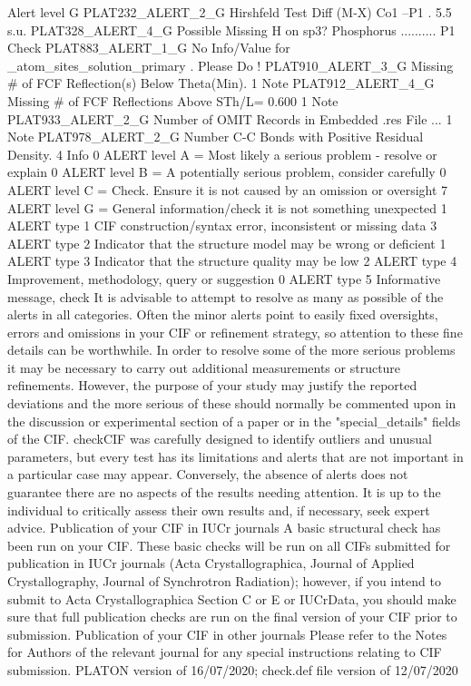  Alert level G
PLAT232_ALERT_2_G Hirshfeld Test Diff (M-X)  Co1      --P1       .        5.5 s.u.  
PLAT328_ALERT_4_G Possible Missing H on sp3? Phosphorus ..........         P1 Check 
PLAT883_ALERT_1_G No Info/Value for _atom_sites_solution_primary .     Please Do !  
PLAT910_ALERT_3_G Missing # of FCF Reflection(s) Below Theta(Min).          1 Note  
PLAT912_ALERT_4_G Missing # of FCF Reflections Above STh/L=  0.600          1 Note  
PLAT933_ALERT_2_G Number of OMIT Records in Embedded .res File ...          1 Note  
PLAT978_ALERT_2_G Number C-C Bonds with Positive Residual Density.          4 Info  
   0 ALERT level A = Most likely a serious problem - resolve or explain
   0 ALERT level B = A potentially serious problem, consider carefully
   0 ALERT level C = Check. Ensure it is not caused by an omission or oversight
   7 ALERT level G = General information/check it is not something unexpected
   1 ALERT type 1 CIF construction/syntax error, inconsistent or missing data
   3 ALERT type 2 Indicator that the structure model may be wrong or deficient
   1 ALERT type 3 Indicator that the structure quality may be low
   2 ALERT type 4 Improvement, methodology, query or suggestion
   0 ALERT type 5 Informative message, check
It is advisable to attempt to resolve as many as possible of the alerts in all categories. Often the
minor alerts point to easily fixed oversights, errors and omissions in your CIF or refinement
strategy, so attention to these fine details can be worthwhile. In order to resolve some of the more
serious problems it may be necessary to carry out additional measurements or structure
refinements. However, the purpose of your study may justify the reported deviations and the more
serious of these should normally be commented upon in the discussion or experimental section of a
paper or in the "special_details" fields of the CIF. checkCIF was carefully designed to identify
outliers and unusual parameters, but every test has its limitations and alerts that are not important
in a particular case may appear. Conversely, the absence of alerts does not guarantee there are no
aspects of the results needing attention. It is up to the individual to critically assess their own
results and, if necessary, seek expert advice.
Publication of your CIF in IUCr journals 
A basic structural check has been run on your CIF. These basic checks will be run on all CIFs
submitted for publication in IUCr journals (Acta Crystallographica, Journal of Applied 
Crystallography, Journal of Synchrotron Radiation); however, if you intend to submit to Acta
Crystallographica Section C or E or IUCrData, you should make sure that full publication checks
are run on the final version of your CIF prior to submission.
Publication of your CIF in other journals 
Please refer to the Notes for Authors of the relevant journal for any special instructions relating to
CIF submission.
PLATON version of 16/07/2020; check.def file version of 12/07/2020 


